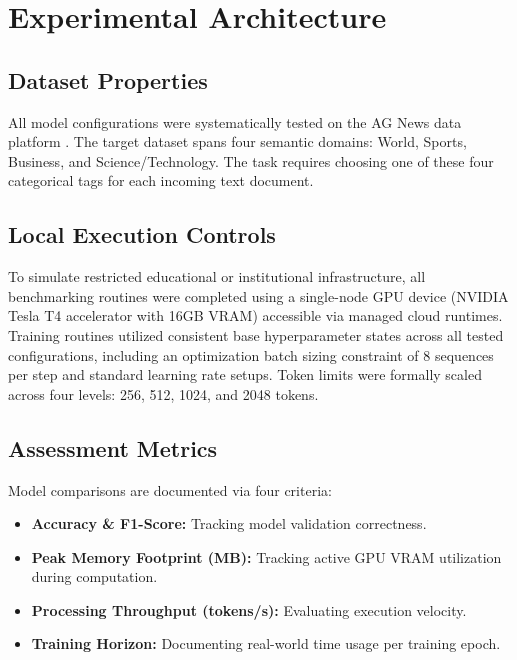 \documentclass[runningheads]{llncs}
\begin{document}
\section{Experimental Architecture}

\subsection{Dataset Properties}
All model configurations were systematically tested on the AG News data platform \cite{agnews}. The target dataset spans four semantic domains: World, Sports, Business, and Science/Technology. The task requires choosing one of these four categorical tags for each incoming text document.

\subsection{Local Execution Controls}
To simulate restricted educational or institutional infrastructure, all benchmarking routines were completed using a single-node GPU device (NVIDIA Tesla T4 accelerator with 16GB VRAM) accessible via managed cloud runtimes. Training routines utilized consistent base hyperparameter states across all tested configurations, including an optimization batch sizing constraint of 8 sequences per step and standard learning rate setups. Token limits were formally scaled across four levels: 256, 512, 1024, and 2048 tokens.

\subsection{Assessment Metrics}
Model comparisons are documented via four criteria:
\begin{itemize}
    \item \textbf{Accuracy \& F1-Score:} Tracking model validation correctness.
    \item \textbf{Peak Memory Footprint (MB):} Tracking active GPU VRAM utilization during computation.
    \item \textbf{Processing Throughput (tokens/s):} Evaluating execution velocity.
    \item \textbf{Training Horizon:} Documenting real-world time usage per training epoch.
\end{itemize}

\end{document}
